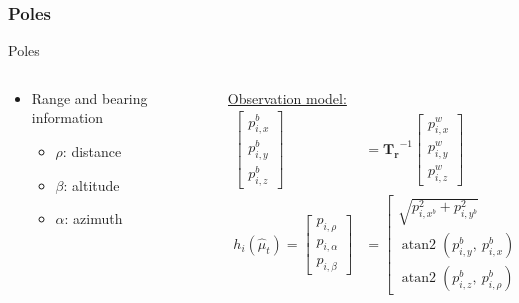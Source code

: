\documentclass[serif,aspectratio=169]{beamer}
\newcommand{\atantwo}[2]{\operatorname{atan2}\left(#1,~#2\right)}
\begin{document}
    \subsubsection{Poles}
    \begin{frame}{Poles}
        \begin{columns}[c]
            \begin{column}{.5\textwidth}
                \begin{itemize}
                    \item{Range and bearing information \begin{itemize}
                            \item{$\rho$: distance}
                            \item{$\beta$: altitude}
                            \item{$\alpha$: azimuth}
                    \end{itemize}}
                \end{itemize}
            \end{column}
            \begin{column}{.5\textwidth}
                \underline{Observation model:}
                \begin{align*}
                    \begin{bmatrix}
                        p_{i, x}^b \\ p_{i, y}^b \\ p_{i, z}^b
                    \end{bmatrix} &= \bm{T_r}^{-1} \begin{bmatrix}
                        p_{i, x}^w \\ p_{i, y}^w \\ p_{i, z}^w
                    \end{bmatrix}\\
                    h_i(\hat\mu_t) = \begin{bmatrix}
                        p_{i, \rho} \\ p_{i, \alpha} \\ p_{i, \beta}
                    \end{bmatrix} &= \begin{bmatrix}
                        \sqrt{ p_{i, x^b}^2 + p_{i, y^b}^2 } \\
                        \atantwo{p_{i, y}^b}{p_{i, x}^b} \\
                        \atantwo{p_{i, z}^b}{p_{i,\rho}^b}
                    \end{bmatrix}
                \end{align*}
            \end{column}
        \end{columns}
    \end{frame}
\end{document}
